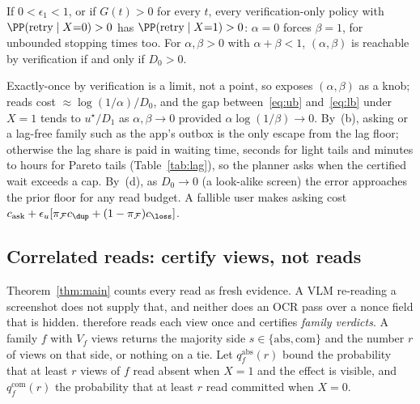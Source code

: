 \begin{corollary}
\label{cor:notfree}
If $0<\epsilon_1<1$, or if $G(t)>0$ for every $t$, every verification-only policy with $\PP(\text{retry}\mid X{=}0)>0$ has $\PP(\text{retry}\mid X{=}1)>0$: $\alpha=0$ forces $\beta=1$,
for unbounded stopping times too. For $\alpha,\beta>0$ with $\alpha+\beta<1$, $(\alpha,\beta)$ is reachable by verification if and only if $D_0>0$.
\end{corollary}

 Exactly-once by verification is a limit, not a point, so \sys exposes $(\alpha,\beta)$ as a knob; reads cost $\approx\log(1/\alpha)/D_0$, and the gap
between~\eqref{eq:ub} and~\eqref{eq:lb} under $X{=}1$ tends to $u^\star/D_1$ as $\alpha,\beta\to0$ provided $\alpha\log(1/\beta)\to0$. By~(b), asking or a lag-free family such as
the app's outbox is the only escape from the lag floor; otherwise the lag share is paid in waiting time, seconds for light tails and minutes to hours for Pareto tails
(Table~\ref{tab:lag}), so the planner asks when the certified wait exceeds a cap. By~(d), as $D_0\to0$ (a look-alike screen) the error approaches the prior floor for any
read budget. A fallible user makes asking cost $c_{\mathrm{ask}}+\epsilon_u[\pi_{\mathcal F}c_{\dup}+(1-\pi_{\mathcal F})c_{\loss}]$.

\subsection{Correlated reads: certify views, not reads}
\label{sec:theory-corr}
Theorem~\ref{thm:main} counts every read as fresh evidence. A VLM re-reading a screenshot does not supply that, and neither does an OCR pass over a nonce
field that is hidden. \alg therefore reads each view once and certifies \emph{family verdicts}. A family $f$ with $V_f$ views returns the majority side
$s\in\{\mathrm{abs},\mathrm{com}\}$ and the number $r$ of views on that side, or nothing on a tie. Let $q^{\mathrm{abs}}_f(r)$ bound the probability that at least $r$
views of $f$ read absent when $X{=}1$ and the effect is visible, and $q^{\mathrm{com}}_f(r)$ the probability that at least $r$ read committed when $X{=}0$.

